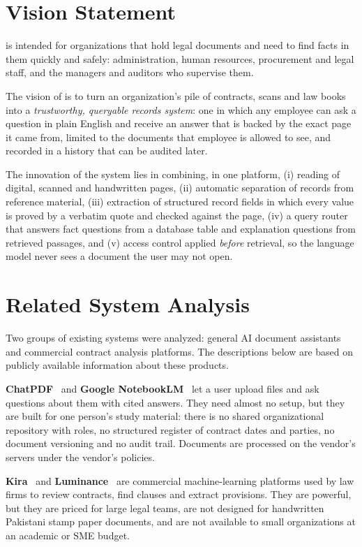 \section{Vision Statement}
\sysname{} is intended for organizations that hold legal documents and need to find facts in them
quickly and safely: administration, human resources, procurement and legal staff, and the managers
and auditors who supervise them.

The vision of \sysname{} is to turn an organization's pile of contracts, scans and law books into a
\emph{trustworthy, queryable records system}: one in which any employee can ask a question in plain
English and receive an answer that is backed by the exact page it came from, limited to the
documents that employee is allowed to see, and recorded in a history that can be audited later.

The innovation of the system lies in combining, in one platform, (i) reading of digital, scanned and
handwritten pages, (ii) automatic separation of records from reference material, (iii) extraction of
structured record fields in which every value is proved by a verbatim quote and checked against the
page, (iv) a query router that answers fact questions from a database table and explanation
questions from retrieved passages, and (v) access control applied \emph{before} retrieval, so the
language model never sees a document the user may not open.

\section{Related System Analysis}
Two groups of existing systems were analyzed: general AI document assistants and commercial contract
analysis platforms. The descriptions below are based on publicly available information about these
products.

\textbf{ChatPDF}~\cite{chatpdf} and \textbf{Google NotebookLM}~\cite{notebooklm} let a user upload
files and ask questions about them with cited answers. They need almost no setup, but they are
built for one person's study material: there is no shared organizational repository with roles, no
structured register of contract dates and parties, no document versioning and no audit trail.
Documents are processed on the vendor's servers under the vendor's policies.

\textbf{Kira}~\cite{kira} and \textbf{Luminance}~\cite{luminance} are commercial machine-learning
platforms used by law firms to review contracts, find clauses and extract provisions. They are
powerful, but they are priced for large legal teams, are not designed for handwritten Pakistani stamp
paper documents, and are not available to small organizations at an academic or SME budget.

